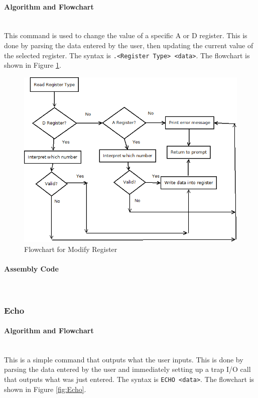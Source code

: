 \documentclass[12pt]{article}
\begin{document}
			\paragraph{Algorithm and Flowchart}~\\
				This command is used to change the value of a specific A or D register. This is done by parsing the data entered by the user, then updating the current value of the selected register. The syntax is \texttt{.<Register Type> <data>}. The flowchart is shown in Figure \ref{fig:ModifyReg}.
			
			
			
\begin{figure}[H]
\centering
\includegraphics[width=0.7\linewidth]{ModifyReg}
\caption{Flowchart for Modify Register}
\label{fig:ModifyReg}
\end{figure}
			\paragraph{Assembly Code}~\\				%
			
			\subsubsection{Echo}
			\paragraph{Algorithm and Flowchart}~\\
			This is a simple command that outputs what the user inputs. This is done by parsing the data entered by the user and immediately setting up a trap I/O call that outputs what was just entered. The syntax is \texttt{ECHO <data>}. The flowchart is shown in Figure \ref{fig:Echo}.
\end{document}
